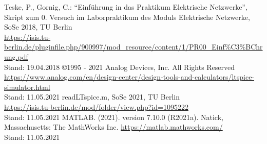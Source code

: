 %
\begin{sloppy}
\begin{small}
\begin{onehalfspacing}
  \begin{thebibliography}{--------------------} %
    Teske, P., Gornig, C.: "`Einführung in das Praktikum Elektrische Netzwerke"', Skript zum 0. Versuch im Laborpraktikum des Moduls Elektrische Netzwerke, SoSe 2018, TU Berlin\\
    \url{https://isis.tu-berlin.de/pluginfile.php/900997/mod_resource/content/1/PR00_Einf\%C3\%BChrung.pdf}\\
    Stand: 19.04.2018
    \copyright 1995 - 2021 Analog Devices, Inc. All Rights Reserved\\
    \url{https://www.analog.com/en/design-center/design-tools-and-calculators/ltspice-simulator.html}\\
    Stand: 11.05.2021
    readLTspice.m, SoSe 2021, TU Berlin\\
    \url{https://isis.tu-berlin.de/mod/folder/view.php?id=1095222}\\
    Stand: 11.05.2021
    MATLAB. (2021). version 7.10.0 (R2021a). Natick, Massachusetts: The MathWorks Inc.
    \url{https://matlab.mathworks.com/}\\
    Stand: 11.05.2021
%
%
  \end{thebibliography}
\end{onehalfspacing}
\end{small}
\end{sloppy}
